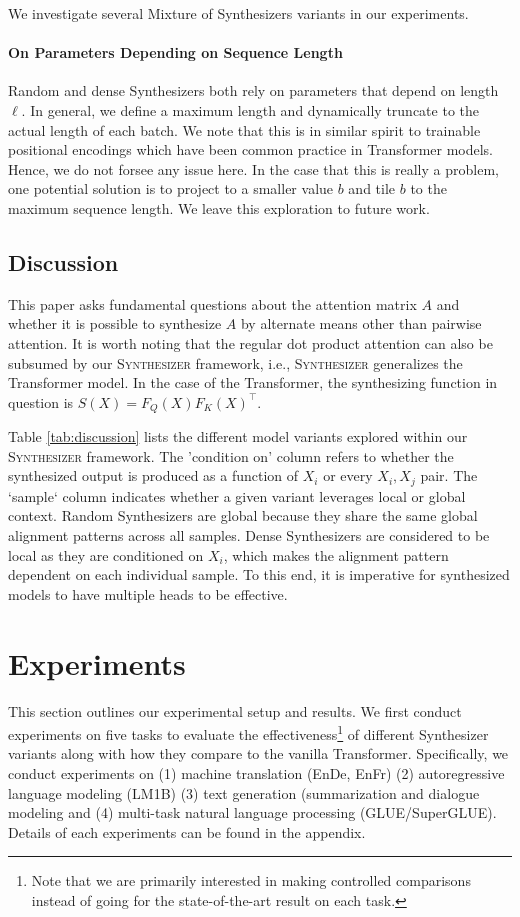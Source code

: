 We investigate several Mixture of Synthesizers variants in our experiments.
\paragraph{On Parameters Depending on Sequence Length} Random and dense Synthesizers both rely on parameters that depend on length $\ell$. In general, we define a maximum length and dynamically truncate to the actual length of each batch. We note that this is in similar spirit to trainable positional encodings which have been common practice in Transformer models. Hence, we do not forsee any issue here. In the case that this is really a problem, one potential solution is to project to a smaller value $b$ and tile $b$ to the maximum sequence length. We leave this exploration to future work.

\subsection{Discussion}
This paper asks fundamental questions about the attention matrix $A$ and whether it is possible to synthesize $A$ by alternate means other than pairwise attention. It is worth noting that the regular dot product attention can also be subsumed by our \textsc{Synthesizer} framework, i.e., \textsc{Synthesizer} generalizes the Transformer model. In the case of the Transformer, the synthesizing function in question is $S(X)=F_Q(X)F_K(X)^\top$.  

Table \ref{tab:discussion} lists the different model variants explored within our \textsc{Synthesizer} framework. The 'condition on' column refers to whether the synthesized output is produced as a function of $X_i$ or every $X_i, X_j$ pair. The `sample` column indicates whether a given variant leverages local or global context. Random Synthesizers are global because they share the same global alignment patterns across all samples. Dense Synthesizers are considered to be local as they are conditioned on $X_i$, which makes the alignment pattern dependent on each individual sample. To this end, it is imperative for synthesized models to have multiple heads to be effective. 

\section{Experiments}
This section outlines our experimental setup and results. We first conduct experiments on five tasks to evaluate the effectiveness\footnote{Note that we are primarily interested in making controlled comparisons instead of going for the state-of-the-art result on each task.} of different Synthesizer variants along with how they compare to the vanilla Transformer. Specifically, we conduct experiments on (1) machine translation (EnDe, EnFr) (2) autoregressive language modeling (LM1B) (3) text generation (summarization and dialogue modeling and (4) multi-task natural language processing (GLUE/SuperGLUE). Details of each experiments can be found in the appendix. 


